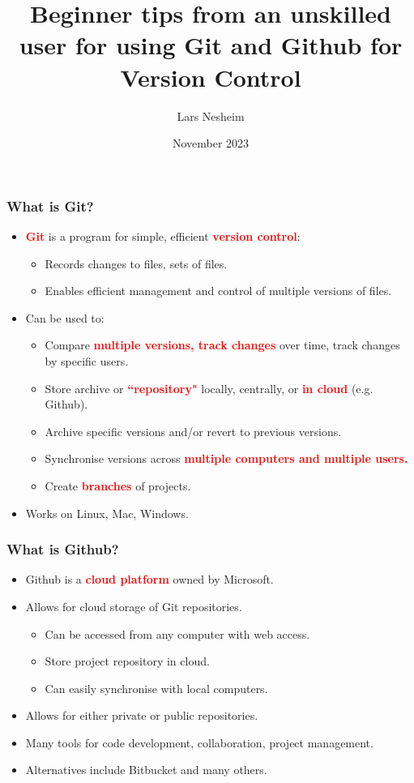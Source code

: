 \documentclass{beamer}
\title{Beginner tips from an unskilled user for using Git and Github for Version Control}
\author{Lars Nesheim }
\date{November 2023}
\begin{document}
\frame{\titlepage}

\begin{frame}
\frametitle{What is Git?}
\begin{itemize}
\item \textcolor{red}{\textbf{Git}} is a program for simple, efficient \textcolor{red}{\textbf{version control}}:
\begin{itemize}
\item Records changes to files, sets of files.
\item Enables efficient management and control of multiple versions of files.
\end{itemize}
\item Can be used to:
\begin{itemize}
\item Compare \textcolor{red}{\textbf{multiple versions, track changes}} over time, track changes by specific users.
\item Store archive or \textcolor{red}{\textbf{``repository"}} locally, centrally, or \textcolor{red}{\textbf{in cloud}} (e.g. Github).
\item Archive specific versions and/or revert to previous versions.
\item Synchronise versions across \textcolor{red}{\textbf{multiple computers and multiple users.}}
\item Create \textcolor{red}{\textbf{branches}} of projects.
\end{itemize}
\item Works on Linux, Mac, Windows.
\end{itemize}
\end{frame}

\begin{frame}
\frametitle{What is Github?}
\begin{itemize}
\item Github is a \textcolor{red}{\textbf{cloud platform}} owned by Microsoft.
\item Allows for cloud storage of Git repositories.
\begin{itemize}
\item Can be accessed from any computer with web access.
\item Store project repository in cloud.
\item Can easily synchronise with local computers. 
\end{itemize}
\item Allows for either private or public repositories.
\item Many tools for code development, collaboration, project management.
\item Alternatives include Bitbucket and many others.
\end{itemize}
\end{frame}
\end{document}
